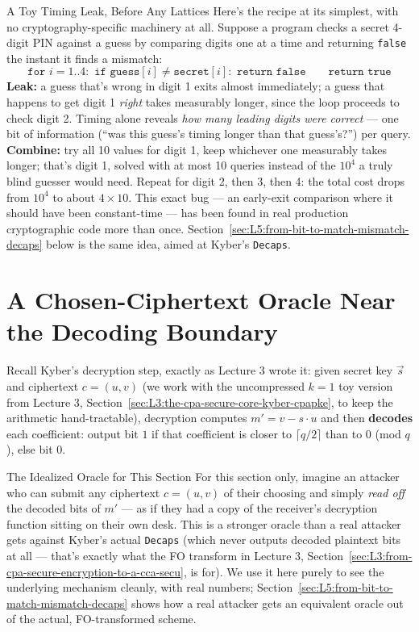 \begin{exbox}{A Toy Timing Leak, Before Any Lattices}
Here's the recipe at its simplest, with no cryptography-specific machinery at all. Suppose a program checks a secret 4-digit PIN against a guess by comparing digits one at a time and returning \texttt{false} the instant it finds a mismatch:
$$
\texttt{for } i = 1..4: \texttt{ if guess}[i] \ne \texttt{secret}[i]: \texttt{ return false} \qquad \texttt{return true}
$$
\textbf{Leak:} a guess that's wrong in digit 1 exits almost immediately; a guess that happens to get digit 1 \emph{right} takes measurably longer, since the loop proceeds to check digit 2. Timing alone reveals \emph{how many leading digits were correct} --- one bit of information (``was this guess's timing longer than that guess's?'') per query. \textbf{Combine:} try all 10 values for digit 1, keep whichever one measurably takes longer; that's digit 1, solved with at most 10 queries instead of the $10^4$ a truly blind guesser would need. Repeat for digit 2, then 3, then 4: the total cost drops from $10^4$ to about $4\times 10$. This exact bug --- an early-exit comparison where it should have been constant-time --- has been found in real production cryptographic code more than once. Section~\ref{sec:L5:from-bit-to-match-mismatch-decaps} below is the same idea, aimed at Kyber's \texttt{Decaps}.
\end{exbox}

\section{A Chosen-Ciphertext Oracle Near the Decoding Boundary}
\label{sec:L5:a-chosen-ciphertext-oracle}

Recall Kyber's decryption step, exactly as Lecture 3 wrote it: given secret key $\vec s$ and ciphertext $c=(u,v)$ (we work with the uncompressed $k=1$ toy version from Lecture 3, Section~\ref{sec:L3:the-cpa-secure-core-kyber-cpapke}, to keep the arithmetic hand-tractable), decryption computes $m' = v - s\cdot u$ and then \textbf{decodes} each coefficient: output bit $1$ if that coefficient is closer to $\lceil q/2\rceil$ than to $0$ (mod $q$), else bit $0$.

\begin{rmkbox}{The Idealized Oracle for This Section}
For this section only, imagine an attacker who can submit any ciphertext $c=(u,v)$ of their choosing and simply \emph{read off} the decoded bits of $m'$ --- as if they had a copy of the receiver's decryption function sitting on their own desk. This is a stronger oracle than a real attacker gets against Kyber's actual \texttt{Decaps} (which never outputs decoded plaintext bits at all --- that's exactly what the FO transform in Lecture 3, Section~\ref{sec:L3:from-cpa-secure-encryption-to-a-cca-secu}, is for). We use it here purely to see the underlying mechanism cleanly, with real numbers; Section~\ref{sec:L5:from-bit-to-match-mismatch-decaps} shows how a real attacker gets an equivalent oracle out of the actual, FO-transformed scheme.
\end{rmkbox}

